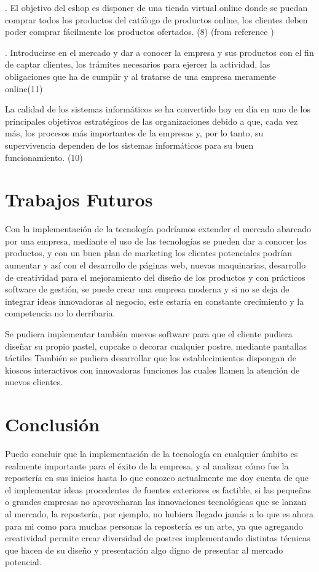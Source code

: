 \documentclass{bmcart}
\begin{document}
. El objetivo del eshop es disponer de una tienda virtual online donde se
puedan comprar todos los productos del catálogo de productos online, los
clientes deben poder comprar fácilmente los productos ofertados. (8) (from reference \cite{nicolau2012plataforma})


. Introducirse en el mercado y dar a conocer la empresa y sus productos con el fin de captar clientes, los trámites necesarios para ejercer la actividad, las obligaciones que ha de cumplir y al tratarse de una empresa meramente online(11)


La calidad de los sistemas informáticos se ha convertido hoy en día en uno de los principales objetivos estratégicos de las organizaciones debido a que, cada vez más, los procesos más importantes de la empresas y, por lo tanto, su supervivencia dependen de los sistemas informáticos para su buen funcionamiento. (10)


\section{Trabajos Futuros}


Con la implementación de la tecnología podríamos extender el mercado abarcado por una empresa, mediante el uso de las tecnologías se pueden dar a conocer los productos, y con un buen plan de marketing los clientes potenciales podrían aumentar y así con el desarrollo de páginas web, nuevas maquinarias, desarrollo de creatividad para el mejoramiento del diseño de los productos y con prácticos software de gestión, se puede crear una empresa moderna y si no se deja de integrar ideas innovadoras al negocio, este estaría en constante crecimiento y la competencia no lo derribaria. 

Se pudiera implementar también nuevos software para que el cliente pudiera diseñar su propio pastel, cupcake o decorar cualquier postre, mediante pantallas táctiles
También se pudiera desarrollar que los establecimientos dispongan de kioscos interactivos con innovadoras funciones las cuales llamen la atención de nuevos clientes.  

\section{Conclusión}
Puedo concluir que la implementación de la tecnología en cualquier ámbito es realmente importante para el éxito de la empresa, y al analizar cómo fue la repostería en sus inicios hasta lo que conozco actualmente me doy cuenta de que el implementar ideas procedentes de fuentes exteriores es factible, si las pequeñas o grandes empresas no aprovecharan las innovaciones tecnológicas que se lanzan al mercado, la repostería, por ejemplo, no hubiera llegado jamás a lo que es ahora para mi como para muchas personas la repostería es un arte, ya que agregando creatividad permite crear diversidad de postres implementando distintas técnicas que hacen de su diseño y presentación algo digno de presentar al mercado potencial.
\end{document}
